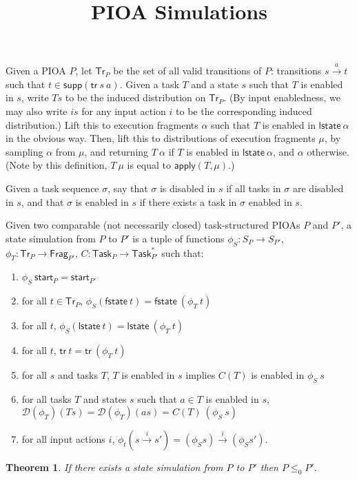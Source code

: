 \documentclass{article}
\newcommand{\tr}{\mathsf{tr}}
\newcommand{\start}{\mathsf{start}}
\newcommand{\supp}{\mathsf{supp}}
\newcommand{\Frag}{\mathsf{Frag}}
\newcommand{\Tr}{\mathsf{Tr}}
\newcommand{\Task}{\mathsf{Task}}
\newcommand{\lst}{\mathsf{lstate}}
\newcommand{\fst}{\mathsf{fstate}}
\newcommand{\D}{\mathcal{D}}
\newtheorem{theorem}{Theorem}
\begin{document}
\title{PIOA Simulations}

\maketitle

Given a PIOA $P$, let $\Tr_P$ be the set of all valid transitions of $P$: transitions $s \xrightarrow{a} t$ such that $t \in \supp(\tr\ s\ a)$. Given a task $T$ and a state $s$ such that $T$ is enabled in $s$, write $Ts$ to be the induced distribution on $\Tr_P$. (By input enabledness, we
may also write $is$ for any input action $i$ to be the corresponding induced distribution.) Lift this to execution fragments $\alpha$ such that $T$ is enabled in $\lst\ \alpha$ in the obvious way. Then, lift this to distributions of execution fragments $\mu$, by sampling $\alpha$ from $\mu$, and returning $T\ \alpha$ if $T$ is enabled in $\lst\ \alpha$, and $\alpha$ otherwise. (Note by this definition, $T\ \mu$ is equal to $\textsf{apply}(T, \mu)$.)

Given a task sequence $\sigma$, say that $\sigma$ is disabled in $s$ if all tasks in $\sigma$ are disabled in $s$, and that $\sigma$ is enabled in $s$ if there exists a task in $\sigma$ enabled in $s$.

Given two comparable (not necessarily closed) task-structured PIOAs $P$ and $P'$, a state simulation from $P$ to $P'$ is a tuple of functions $\phi_S : S_P \to S_{P'}$, $\phi_T : \Tr_P \to \Frag_{P'}$, $C : \Task_P \to \Task_{P'}^*$ such that:
\begin{enumerate}
    \item $\phi_S\ \start_P = \start_{P'}$
    \item for all $t \in \Tr_P$, $\phi_S (\fst\ t) = \fst\ (\phi_T\ t)$
    \item for all $t$, $\phi_S (\lst\ t) = \lst\ (\phi_T\ t)$
    \item for all $t$, $\tr\ t = \tr\ (\phi_T\ t)$
    \item for all $s$ and tasks $T$, $T$ is enabled in $s$ implies $C(T)$ is enabled in $\phi_S\ s$
    \item for all tasks $T$ and states $s$ such that $a \in T$ is enabled in $s$, $\D(\phi_T) (Ts) = \D(\phi_T) (as) = C(T)\ (\phi_S\ s)$
    \item for all input actions $i$, $\phi_t (s \xrightarrow{i} s') = (\phi_S s) \xrightarrow{i} (\phi_S s')$.
\end{enumerate}

\begin{theorem}
    If there exists a state simulation from $P$ to $P'$ then $P \leq_0 P'$.
\end{theorem}
\end{document}
